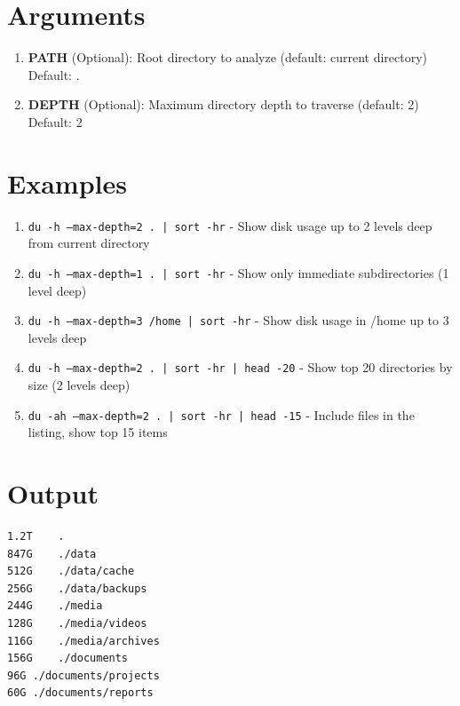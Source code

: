 \documentclass{article}
\begin{document}
\section*{Arguments}
\begin{enumerate}
  \item \textbf{PATH} (Optional): Root directory to analyze (default: current directory) \\ Default: .
  \item \textbf{DEPTH} (Optional): Maximum directory depth to traverse (default: 2) \\ Default: 2
\end{enumerate}

\section*{Examples}
\begin{enumerate}
  \item \texttt{du -h --max-depth=2 . | sort -hr} - Show disk usage up to 2 levels deep from current directory
  \item \texttt{du -h --max-depth=1 . | sort -hr} - Show only immediate subdirectories (1 level deep)
  \item \texttt{du -h --max-depth=3 /home | sort -hr} - Show disk usage in /home up to 3 levels deep
  \item \texttt{du -h --max-depth=2 . | sort -hr | head -20} - Show top 20 directories by size (2 levels deep)
  \item \texttt{du -ah --max-depth=2 . | sort -hr | head -15} - Include files in the listing, show top 15 items
\end{enumerate}

\section*{Output}
\begin{lstlisting}
1.2T	.
847G	./data
512G	./data/cache
256G	./data/backups
244G	./media
128G	./media/videos
116G	./media/archives
156G	./documents
96G	./documents/projects
60G	./documents/reports
\end{lstlisting}
\end{document}
